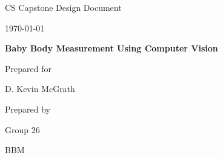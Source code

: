 \documentclass[onecolumn, draftclsnofoot,10pt, compsoc]{IEEEtran}
\def \CapstoneTeamName{		BBM}
\def \CapstoneTeamNumber{		26}
\def \GroupMemberOne{			Aidan Grimshaw}
\def \GroupMemberTwo{			Khoa Tran}
\def \GroupMemberThree{			Aaron Leenknecht}
\def \CapstoneProjectName{		Baby Body Measurement Using Computer Vision}
\def \CapstoneSponsorPerson{		D. Kevin McGrath}
\def \DocType{		%
				Design Document
				}
\newcommand{\NameSigPair}[1]{\par
\makebox[2.75in][r]{#1} \hfil 	\makebox[3.25in]{\makebox[2.25in]{\hrulefill} \hfill		\makebox[.75in]{\hrulefill}}
\par\vspace{-12pt} \textit{\tiny\noindent
\makebox[2.75in]{} \hfil		\makebox[3.25in]{\makebox[2.25in][r]{Signature} \hfill	\makebox[.75in][r]{Date}}}}
\renewcommand{\NameSigPair}[1]{#1}
\begin{document}
\begin{titlepage}
    \begin{singlespace}
        \hfill 
        \par\vspace{.2in}
        \centering
        \scshape{
            \huge CS Capstone \DocType \par
            {\large\today}\par
            \vspace{.5in}
            \textbf{\Huge\CapstoneProjectName}\par
            \vspace{10mm}
            {\large Prepared for}\par
            \vspace{5mm}
            {\Large\NameSigPair{\CapstoneSponsorPerson}\par}
            \vspace{5mm}
            {\large Prepared by }\par
            \vspace{5mm}
            Group\CapstoneTeamNumber\par
            \CapstoneTeamName\par 
            \vspace{5pt}
            {\Large
                
}}
\end{singlespace}
\end{titlepage}
\end{document}
